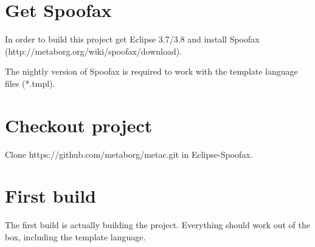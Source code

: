 \documentclass[a4paper,10pt,titlepage]{report}
\begin{document}
\section{Get Spoofax}

In order to build this project get Eclipse 3.7/3.8 and install Spoofax (http://metaborg.org/wiki/spoofax/download).

The nightly version of Spoofax is required to work with the template language files (*.tmpl).

\section{Checkout project}

Clone https://github.com/metaborg/metac.git in Eclipse-Spoofax.

\section{First build}

The first build is actually building the project. Everything should work out of the box, including the template language.
\end{document}
